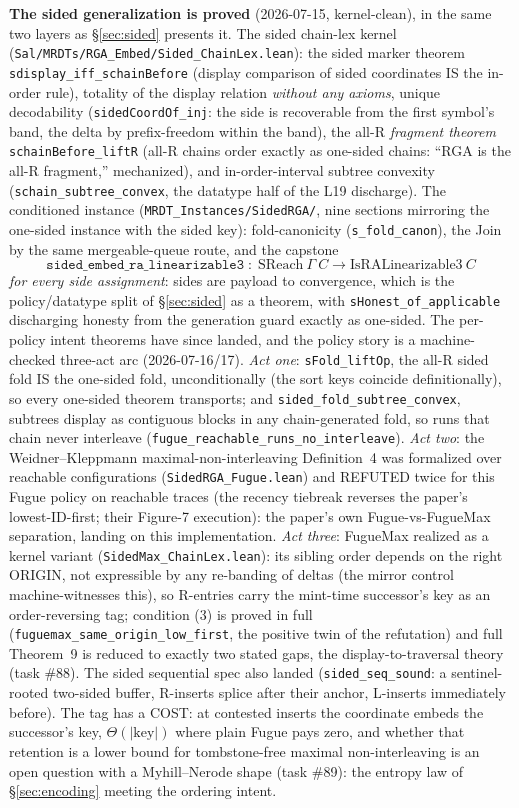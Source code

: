 \documentclass[11pt]{article}
\newcommand{\code}[1]{\texttt{#1}}
\begin{document}
\medskip
\noindent\textbf{The sided generalization is proved} (2026-07-15,
kernel-clean), in the same two layers as \S\ref{sec:sided} presents
it. The sided chain-lex kernel
(\code{Sal/MRDTs/RGA\_Embed/Sided\_ChainLex.lean}): the sided marker
theorem \code{sdisplay\_iff\_schainBefore} (display comparison of
sided coordinates IS the in-order rule), totality of the display
relation \emph{without any axioms}, unique decodability
(\code{sidedCoordOf\_inj}: the side is recoverable from the first
symbol's band, the delta by prefix-freedom within the band), the
all-R \emph{fragment theorem} \code{schainBefore\_liftR} (all-R chains
order exactly as one-sided chains: ``RGA is the all-R fragment,''
mechanized), and in-order-interval subtree convexity
(\code{schain\_subtree\_convex}, the datatype half of the L19
discharge). The conditioned instance
(\code{MRDT\_Instances/SidedRGA/}, nine sections mirroring the
one-sided instance with the sided key): fold-canonicity
(\code{s\_fold\_canon}), the Join by the same mergeable-queue route,
and the capstone
\[
  \code{sided\_embed\_ra\_linearizable3} \;:\;
  \mathrm{SReach}\ \Gamma\ C \to \mathrm{IsRALinearizable3}\ C
\]
\emph{for every side assignment}: sides are payload to convergence,
which is the policy/datatype split of \S\ref{sec:sided} as a theorem,
with \code{sHonest\_of\_applicable} discharging honesty from the
generation guard exactly as one-sided. The per-policy intent
theorems have since landed, and the policy story is a machine-checked
three-act arc (2026-07-16/17). \emph{Act one}: \code{sFold\_liftOp},
the all-R sided fold IS the one-sided fold, unconditionally (the sort
keys coincide definitionally), so every one-sided theorem transports;
and \code{sided\_fold\_subtree\_convex}, subtrees display as
contiguous blocks in any chain-generated fold, so runs that chain
never interleave (\code{fugue\_reachable\_runs\_no\_interleave}).
\emph{Act two}: the Weidner--Kleppmann maximal-non-interleaving
Definition~4 was formalized over reachable configurations
(\code{SidedRGA\_Fugue.lean}) and REFUTED twice for this Fugue
policy on reachable traces (the recency tiebreak reverses the paper's
lowest-ID-first; their Figure-7 execution): the paper's own
Fugue-vs-FugueMax separation, landing on this implementation.
\emph{Act three}: FugueMax realized as a kernel variant
(\code{SidedMax\_ChainLex.lean}): its sibling order depends on the
right ORIGIN, not expressible by any re-banding of deltas (the mirror
control machine-witnesses this), so R-entries carry the mint-time
successor's key as an order-reversing tag; condition (3) is proved in
full (\code{fuguemax\_same\_origin\_low\_first}, the positive twin
of the refutation) and full Theorem~9 is reduced to exactly two
stated gaps, the display-to-traversal theory (task \#88). The sided
sequential spec also landed (\code{sided\_seq\_sound}: a
sentinel-rooted two-sided buffer, R-inserts splice after their
anchor, L-inserts immediately before). The tag has a COST: at
contested inserts the coordinate embeds the successor's key,
$\Theta(|\text{key}|)$ where plain Fugue pays zero, and whether that
retention is a lower bound for tombstone-free maximal
non-interleaving is an open question with a Myhill--Nerode shape
(task \#89): the entropy law of \S\ref{sec:encoding} meeting the
ordering intent.
\end{document}
